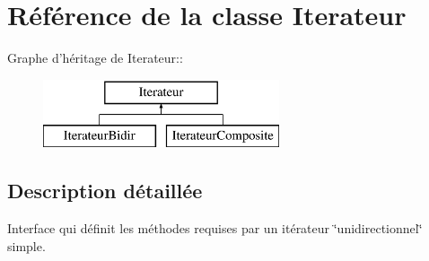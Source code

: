 \section{Référence de la classe Iterateur}
\label{class_iterateur}
Graphe d'héritage de Iterateur::\begin{figure}[H]
\begin{center}
\leavevmode
\includegraphics[height=2cm]{class_iterateur}
\end{center}
\end{figure}


\subsection{Description détaillée}
Interface qui définit les méthodes requises par un itérateur \char`\"{}unidirectionnel\char`\"{} simple. 

